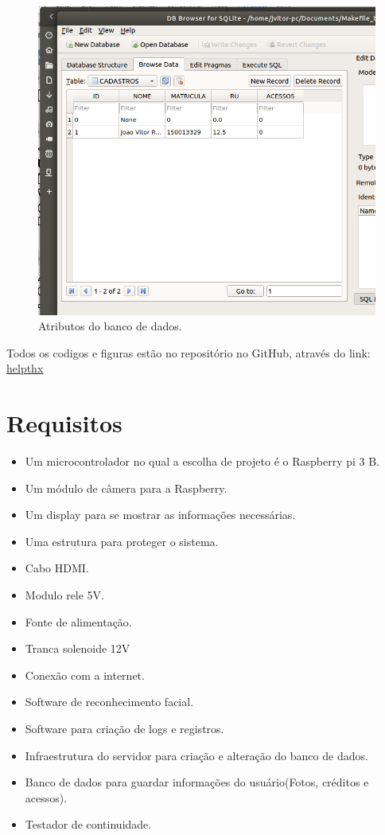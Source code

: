 \documentclass[conference,compsoc]{IEEEtran}
\begin{document}
 \begin{figure}[!ht]
		\centering
		\includegraphics[scale=0.25]{infra_database.png}
		\caption{Atributos do banco de dados.}
\end{figure}

Todos os codigos e figuras estão no repositório no GitHub, através do link:
\href{https://github.com/helpthx/Sistemas_Embarcados/tree/master/2_PCs/Ponto_de_Controle_2/Arquivos_SQL}{helpthx}

\section{Requisitos}
\begin{itemize}
   \item Um microcontrolador no qual a escolha de projeto é o Raspberry pi 3 B. 
   \item Um módulo de câmera para a Raspberry.
   \item Um display para se mostrar as informações necessárias.
   \item Uma estrutura para proteger o sistema.
   \item Cabo HDMI.
   \item Modulo rele 5V.
   \item Fonte de alimentação.
   \item Tranca solenoide 12V
   \item Conexão com a internet.
   \item Software de reconhecimento facial.
   \item Software  para criação de logs e registros.
   \item  Infraestrutura do servidor para criação e alteração do banco de dados.
   \item Banco de dados para guardar informações do usuário(Fotos, créditos e acessos).
   \item Testador de continuidade.
 \end{itemize}
 
\end{document}
